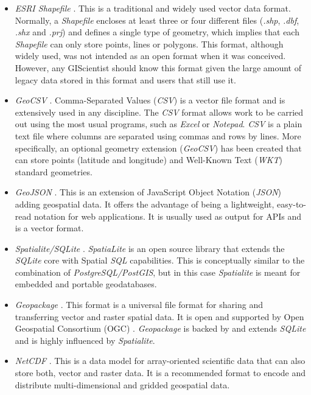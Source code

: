 \documentclass[ijgi,article,submit,moreauthors,pdftex]{Definitions/mdpi}
\begin{document}
\begin{itemize}
\item \textit{ESRI Shapefile} \cite{esriShapefile}. This is a traditional and widely used vector data format. Normally, a \textit{Shapefile} encloses at least three or four different files (\textit{.shp}, \textit{.dbf}, \textit{.shx} and \textit{.prj}) and defines a single type of geometry, which implies that each \textit{Shapefile} can only store points, lines or polygons. This format, although widely used, was not intended as an open format when it was conceived. However, any GIScientist should know this format given the large amount of legacy data stored in this format and users that still use it.
\item \textit{GeoCSV} \cite{stults2015geocsv}. Comma-Separated Values (\textit{CSV}) is a vector file format  and is extensively used in any discipline. The \textit{CSV} format allows work to be carried out using the most usual programs, such as \textit{Excel} or \textit{Notepad}. \textit{CSV} is a plain text file where columns are separated using commas and rows by lines. More specifically, an optional geometry extension (\textit{GeoCSV}) has been created that can store points (latitude and longitude) and Well-Known Text (\textit{WKT}) standard geometries.
\item \textit{GeoJSON} \cite{butler2016geojson}. This is an extension of JavaScript Object Notation (\textit{JSON}) adding geospatial data. It offers the advantage of being a lightweight, easy-to-read notation for web applications. It is usually used as output for APIs and is a vector format.
\item \textit{Spatialite/SQLite} \cite{spatialite}. \textit{SpatiaLite} is an open source library that extends the \textit{SQLite} core with Spatial \textit{SQL} capabilities. This is conceptually similar to the combination of \textit{PostgreSQL/PostGIS}, but in this case \textit{Spatialite} is meant for embedded and portable geodatabases.
\item \textit{Geopackage} \cite{geopackage}. This format is a universal file format for sharing and transferring vector and raster spatial data. It is open and supported by Open Geospatial Consortium (OGC) \cite{ogc}. \textit{Geopackage} is backed by and extends \textit{SQLite} and is highly influenced by \textit{Spatialite}.
\item \textit{NetCDF} \cite{netCDF}. This is a data model for array-oriented scientific data that can also store both, vector and raster data. It is a recommended format to encode and distribute multi-dimensional and gridded geospatial data.
\end{itemize}
\end{document}
